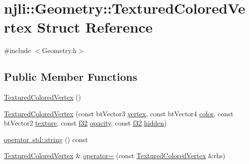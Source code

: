 \hypertarget{structnjli_1_1_geometry_1_1_textured_colored_vertex}{}\section{njli\+:\+:Geometry\+:\+:Textured\+Colored\+Vertex Struct Reference}
\label{structnjli_1_1_geometry_1_1_textured_colored_vertex}


{\ttfamily \#include $<$Geometry.\+h$>$}

\subsection*{Public Member Functions}
\begin{DoxyCompactItemize}
\item 
\mbox{\hyperlink{structnjli_1_1_geometry_1_1_textured_colored_vertex_a9981d5820df41bf186e25f16fa856d12}{Textured\+Colored\+Vertex}} ()
\item 
\mbox{\hyperlink{structnjli_1_1_geometry_1_1_textured_colored_vertex_ab9fb6f1e0a5a679e666072a8ee0a4c41}{Textured\+Colored\+Vertex}} (const bt\+Vector3 \mbox{\hyperlink{structnjli_1_1_geometry_1_1_textured_colored_vertex_ab49b5720f1cdbf1c63e62681db8f090f}{vertex}}, const bt\+Vector4 \mbox{\hyperlink{structnjli_1_1_geometry_1_1_textured_colored_vertex_a79e6bb9cb0daa0307eac09b828e4d993}{color}}, const bt\+Vector2 \mbox{\hyperlink{structnjli_1_1_geometry_1_1_textured_colored_vertex_a933ff52f4cd0a7768836e458f1a1218c}{texture}}, const \mbox{\hyperlink{_util_8h_a5f6906312a689f27d70e9d086649d3fd}{f32}} \mbox{\hyperlink{structnjli_1_1_geometry_1_1_textured_colored_vertex_a8c7d91ac68083909b5116f7d130c39ca}{opacity}}, const \mbox{\hyperlink{_util_8h_a5f6906312a689f27d70e9d086649d3fd}{f32}} \mbox{\hyperlink{structnjli_1_1_geometry_1_1_textured_colored_vertex_a506ec1fdd64c4b0530a33a53d075c3d2}{hidden}})
\item 
\mbox{\hyperlink{structnjli_1_1_geometry_1_1_textured_colored_vertex_a15c9426d82becac2545bf4533c91d6c6}{operator std\+::string}} () const
\item 
\mbox{\hyperlink{structnjli_1_1_geometry_1_1_textured_colored_vertex}{Textured\+Colored\+Vertex}} \& \mbox{\hyperlink{structnjli_1_1_geometry_1_1_textured_colored_vertex_a50ea2a8262cb361b75f65a2a8b2d1006}{operator=}} (const \mbox{\hyperlink{structnjli_1_1_geometry_1_1_textured_colored_vertex}{Textured\+Colored\+Vertex}} \&rhs)
\end{DoxyCompactItemize}
